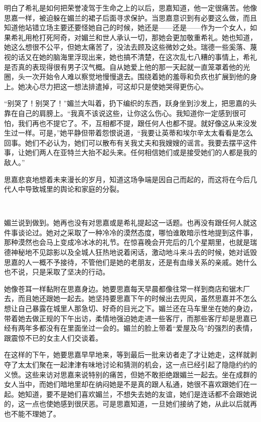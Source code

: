 \par 明白了希礼是如何把荣誉凌驾于生命之上的以后，思嘉知道，他一定很痛苦。他像思嘉一样，被迫躲在媚兰的裙子后面寻求保护。当思嘉意识到有必要这么做，而且知道他站错立场主要还要怪她自己的时候，她还是——还是——作为一个女人，如果希礼用枪打死阿奇，对媚兰和世人承认一切，那她会更加敬重希礼。她也知道，她这么想很不公平，但她太痛苦了，没法去顾及这些微妙之处。瑞德一些奚落、蔑视的话又在她的脑海里浮现出来，她也搞不清楚，在这次乱七八糟的事情上，希礼是否真的表现得很有男子汉气概。自从她爱上他的那一天起就一直笼罩着他的光圈，头一次开始令人难以察觉地慢慢退去。围绕着她的羞辱和负疚也扩展到他的身上。她决心尽力把这一想法排遣掉，可这却只是使她哭得更伤心。
\par “别哭了！别哭了！”媚兰大叫着，扔下编织的东西，跃身坐到沙发上，把思嘉的头靠在自己的肩膀上。“我真不该说这些，让你这么伤心。我知道你一定感到很可怕，我们再也不提它了。不，互相都不提，跟任何人也都不提。就好像这从来没发生过一样。可是，”她平静但带着怨恨说道，“我要让英蒂和埃尔辛太太看看是怎么回事。她们不必认为，她们可以散布有关我丈夫和我嫂嫂的谣言。我要去摆平这件事，让她们两人在亚特兰大抬不起头来。任何相信她们或是接受她们的人都是我的敌人。”
\par 思嘉悲哀地想着未来漫长的岁月，知道这场争端是因自己而起的，而这将在今后几代人中导致城里的舆论和家庭的分裂。
\par  
\par 媚兰说到做到。她再也没有对思嘉或是希礼提起这一话题。也再没有跟任何人就这件事谈论过。她对之采取了一种冷冷的漠然态度，哪怕谁敢暗示性地提到这件事，那种漠然也会马上变成冷冰冰的礼节。在惊喜晚会开完后的几个星期里，也就是瑞德神秘地不见踪影以及全城人狂热地说着闲话，激动地斗来斗去的时候，她对诋毁思嘉的人一概不予接待，不管他们是她的老朋友，还是有血缘关系的亲戚。她什么也不说，只是采取了坚决的行动。
\par 她像苍耳一样黏附在思嘉身边。她要思嘉每天早晨都像往常一样到商店和锯木厂去，而且她还跟她一起去。她坚持要思嘉下午的时候出去兜风，虽然思嘉并不怎么想让自己暴露在城里人那急切、好奇的目光之下。媚兰还在马车里坐在她的身边，带着她去做正规的下午出访，柔情地强迫她走进一些客厅，而那些客厅却是思嘉已经有两年多都没有在里面坐过一会的。媚兰的脸上带着“爱屋及乌”的强烈的表情，跟震惊不已的女主人们交谈着。
\par 在这样的下午，她要思嘉早早地来，等到最后一批来访者走了才让她走，这样就剥夺了太太们聚在一起津津有味地讨论和猜测的机会，这一点已经引起了隐隐约约的义愤。这些来访对思嘉来说特别的痛苦，但她不敢拒绝跟媚兰一起去。坐在成群的女人当中，而她们暗地里却在纳闷她是不是真的跟人私通，她很不喜欢跟她们在一起。她知道，要不是她们喜欢媚兰，不想失去她的友谊，她们是连话都不会跟她说的，这一点也使她感到很厌恶。可是思嘉知道，一旦她们接纳了她，从此以后就再也不能不理她了。
